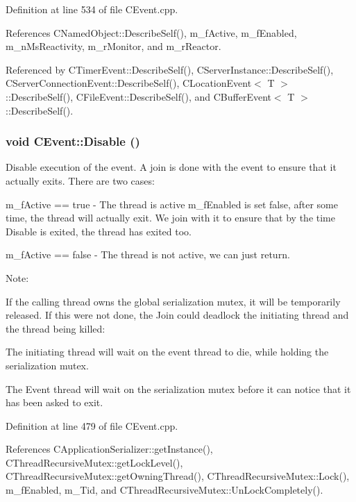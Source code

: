 Definition at line 534 of file CEvent.cpp.

References CNamed\-Object::Describe\-Self(), m\_\-f\-Active, m\_\-f\-Enabled, m\_\-n\-Ms\-Reactivity, m\_\-r\-Monitor, and m\_\-r\-Reactor.

Referenced by CTimer\-Event::Describe\-Self(), CServer\-Instance::Describe\-Self(), CServer\-Connection\-Event::Describe\-Self(), CLocation\-Event$<$ T $>$::Describe\-Self(), CFile\-Event::Describe\-Self(), and CBuffer\-Event$<$ T $>$::Describe\-Self().
\subsubsection{\setlength{\rightskip}{0pt plus 5cm}void CEvent::Disable ()}\label{classCEvent_a12}


Disable execution of the event. A join is done with the event to ensure that it actually exits. There are two cases:\begin{CompactItemize}
\item 
m\_\-f\-Active == true - The thread is active m\_\-f\-Enabled is set false, after some time, the thread will actually exit. We join with it to ensure that by the time Disable is exited, the thread has exited too.\item 
m\_\-f\-Active == false - The thread is not active, we can just return.\end{CompactItemize}
\begin{Desc}
\item[Note: ]\par
If the calling thread owns the global serialization mutex, it will be temporarily released. If this were not done, the Join could  deadlock the initiating thread and the thread being killed:\begin{CompactItemize}
\item 
The initiating thread will wait on the event thread to die, while holding the serialization mutex.\item 
The Event thread will wait on the serialization mutex before it can notice that it has been asked to exit. \end{CompactItemize}
\end{Desc}


Definition at line 479 of file CEvent.cpp.

References CApplication\-Serializer::get\-Instance(), CThread\-Recursive\-Mutex::get\-Lock\-Level(), CThread\-Recursive\-Mutex::get\-Owning\-Thread(), CThread\-Recursive\-Mutex::Lock(), m\_\-f\-Enabled, m\_\-Tid, and CThread\-Recursive\-Mutex::Un\-Lock\-Completely().

